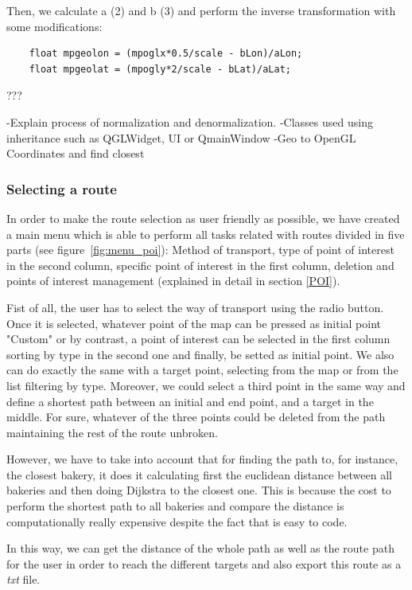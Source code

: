 \documentclass{article}
\begin{document}
Then, we calculate a (2) and b (3) and perform the inverse transformation with some modifications:

\begin{lstlisting}
    float mpgeolon = (mpoglx*0.5/scale - bLon)/aLon;
    float mpgeolat = (mpogly*2/scale - bLat)/aLat;
\end{lstlisting}

???



-Explain process of normalization and denormalization.
-Classes used using inheritance such as QGLWidget, UI or QmainWindow
-Geo to OpenGL Coordinates and find closest

\subsubsection{Selecting a route}
In order to make the route selection as user friendly as possible, we have created a main menu which is able to perform all tasks related with routes divided in five parts (see figure~\ref{fig:menu_poi}): Method of transport, type of point of interest in the second column, specific point of interest in the first column, deletion and points of interest management (explained in detail in section \ref{POI}).

Fist of all, the user has to select the way of transport using the radio button. Once it is selected, whatever point of the map can be pressed as initial point "Custom" or by contrast, a point of interest can be selected in the first column sorting by type in the second one and finally, be setted as initial point. We also can do exactly the same with a target point, selecting from the map or from the list filtering by type. Moreover, we could select a third point in the same way and define a shortest path between an initial and end point, and a target in the middle. For sure, whatever of the three points could be deleted from the path maintaining the rest of the route unbroken.

However, we have to take into account that for finding the path to, for instance, the closest bakery, it does it calculating first the euclidean distance between all bakeries and then doing Dijkstra to the closest one. This is because the cost to perform the shortest path to all bakeries and compare the distance is computationally really expensive despite the fact that is easy to code.

In this way, we can get the distance of the whole path as well as the route path for the user in order to reach the different targets and also export this route as a \textit{txt} file.
\end{document}

